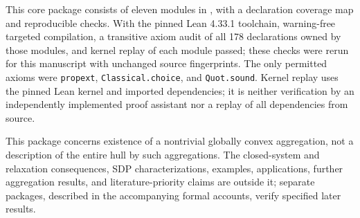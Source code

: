 This core package consists of eleven modules in
, with a declaration
coverage map and reproducible checks. With the pinned Lean 4.33.1
toolchain, warning-free targeted compilation, a transitive axiom audit
of all 178 declarations owned by those modules, and kernel replay of
each module passed; these checks were rerun for this manuscript with
unchanged source fingerprints. The only permitted axioms were
\texttt{propext}, \texttt{Classical.choice}, and \texttt{Quot.sound}.
Kernel replay uses the pinned Lean kernel and imported dependencies; it
is neither verification by an independently implemented proof assistant
nor a replay of all dependencies from source.

This package concerns existence of a nontrivial globally convex
aggregation, not a description of the entire hull by such aggregations.
The closed-system and relaxation consequences, SDP characterizations,
examples, applications, further aggregation results, and
literature-priority claims are outside it; separate packages,
described in the accompanying formal accounts, verify specified later
results.
